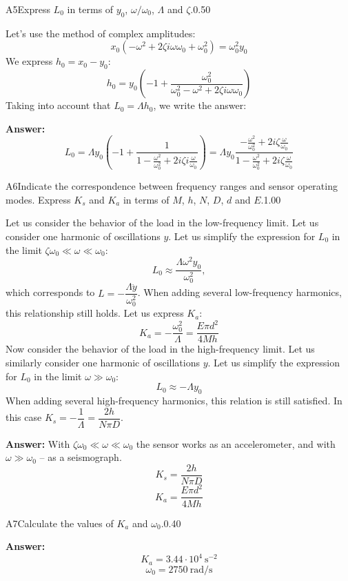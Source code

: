 \documentclass[11pt,a4paper]{article}
\begin{document}
\begin{solcard}{A5}{Express $L_0$ in terms of $y_0$, $\omega/\omega_0$, $\Lambda$ and $\zeta$.}{0.50}

Let's use the method of complex amplitudes: \[x_0(-\omega^2+2\zeta i\omega\omega_0 + \omega_0^2)=\omega_0^2 y_0\]We express $h_0=x_0-y_0$: \[h_0=y_0\left(-1+\dfrac{\omega_0^2}{\omega_0^2-\omega^2+2\zeta i\omega\omega_0}\right)\]Taking into account that $L_0=\Lambda h_0$, we write the answer:

\par\smallskip\noindent\textbf{Answer:} \[L_0=\Lambda y_0\left(-1+\dfrac{1}{1-\frac{\omega^2}{\omega_0^2}+2i\zeta i\frac{\omega}{\omega_0}}\right) = \Lambda y_0 \frac{-\frac{\omega^2}{\omega_0^2} + 2 i \zeta \frac{\omega}{\omega_0}}{1-\frac{\omega^2}{\omega_0^2}+2i\zeta \frac{\omega}{\omega_0}}\]
\end{solcard}

\begin{solcard}{A6}{Indicate the correspondence between frequency ranges and sensor operating modes. Express $K_s$ and $K_a$ in terms of $M$, $h$, $N$, $D$, $d$ and $E$.}{1.00}

Let us consider the behavior of the load in the low-frequency limit. Let us consider one harmonic of oscillations $y$. Let us simplify the expression for $L_0$ in the limit $\zeta\omega_0\ll\omega\ll\omega_0$: \[L_0\approx \dfrac{\Lambda\omega^2 y_0}{\omega_0^2},\] which corresponds to $L=-\dfrac{\Lambda\ddot y}{\omega_0^2}$. When adding several low-frequency harmonics, this relationship still holds. Let us express $K_a$: \[K_a=-\dfrac{\omega_0^2}{\Lambda}={\dfrac{E\pi d^2 }{4Mh}}\]Now consider the behavior of the load in the high-frequency limit. Let us similarly consider one harmonic of oscillations $y$. Let us simplify the expression for $L_0$ in the limit $\omega\gg\omega_0$: \[L_0\approx-\Lambda y_0\]When adding several high-frequency harmonics, this relation is still satisfied. In this case $K_s=-\dfrac{1}{\Lambda}=\dfrac{2h}{N\pi D}$.

\par\smallskip\noindent\textbf{Answer:} With $\zeta\omega_0\ll\omega\ll\omega_0$ the sensor works as an accelerometer, and with $\omega\gg\omega_0$ – as a seismograph. \[K_s=\dfrac{2h}{N\pi D}\]\[K_a={\dfrac{E\pi d^2 }{4Mh}}\]
\end{solcard}

\begin{solcard}{A7}{Calculate the values of $K_a$ and $\omega_0$.}{0.40}
\par\smallskip\noindent\textbf{Answer:} \[K_a=3.44\cdot 10^4~\mathrm{s}^{-2}\]\[\omega_0=2750~\mathrm{rad}/\mathrm{s}\]
\end{solcard}
\end{document}
